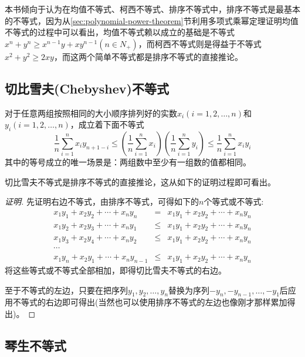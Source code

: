 本书倾向于认为在均值不等式、柯西不等式、排序不等式中，排序不等式是最基本的不等式，因为从\ref{sec:polynomial-power-theorem}节利用多项式乘幂定理证明均值不等式的过程中可以看出，均值不等式赖以成立的基础是不等式$x^n+y^n \geqslant x^{n-1}y+xy^{n-1}(n \in N_+)$，而柯西不等式则是得益于不等式$x^2+y^2 \geqslant 2xy$，而这两个简单不等式都是排序不等式的直接推论。

\subsection{切比雪夫(Chebyshev)不等式}

\begin{theorem}[切比雪夫不等式]
对于任意两组按照相同的大小顺序排列好的实数$x_i(i=1,2,\ldots,n)$和$y_i(i=1,2,\ldots,n)$，成立着下面不等式
\begin{equation}
  \label{eq:chebyshev-inequation}
  \frac{1}{n}\sum_{i=1}^nx_iy_{n+1-i}
  \leqslant \left( \frac{1}{n}\sum_{i=1}^nx_i \right) \left( \frac{1}{n}\sum_{i=1}^ny_i \right)
  \leqslant \frac{1}{n}\sum_{i=1}^nx_iy_i
\end{equation}
其中的等号成立的唯一场景是：两组数中至少有一组数的值都相同。
\end{theorem}

切比雪夫不等式是排序不等式的直接推论，这从如下的证明过程即可看出。

\begin{proof}[证明]
  先证明右边不等式，由排序不等式，可得如下的$n$个等式或不等式:
  \begin{eqnarray*}
    x_1y_1+x_2y_2+\cdots+x_ny_n &=& x_1y_1+x_2y_2+\cdots+x_ny_n \\
    x_1y_2+x_2y_3+\cdots+x_ny_1 & \leqslant & x_1y_1+x_2y_2+\cdots+x_ny_n \\
    x_1y_3+x_2y_4+\cdots+x_ny_2 & \leqslant & x_1y_1+x_2y_2+\cdots+x_ny_n \\
    \cdots & & \\
    x_1y_n+x_2y_1+\cdots+x_ny_{n-1} & \leqslant & x_1y_1+x_2y_2+\cdots+x_ny_n 
  \end{eqnarray*}
  将这些等式或不等式全部相加，即得切比雪夫不等式的右边。

  至于不等式的左边，只要在把序列$y_1,y_2,\ldots,y_n$替换为序列$-y_n,-y_{n-1},\ldots,-y_1$后应用不等式的右边即可得出(当然也可以使用排序不等式的左边也像刚才那样累加得出)。
\end{proof}

\subsection{琴生不等式}
\label{sec:jenson-inequality}

